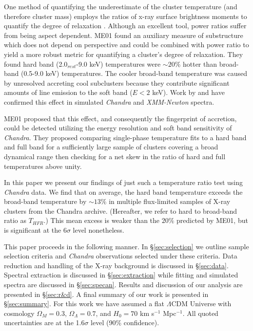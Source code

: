 \documentclass{emulateapj}
\newcommand{\tf}{T_{HFR} }
\begin{document}
One method of quantifying the underestimate of the cluster temperature 
(and therefore cluster mass) employs the ratios of x-ray surface brightness moments  
to quantify the degree of
relaxation \citep{1995ApJ...452..522B, 1996ApJ...458...27B,
2005ApJ...624..606J}. Although an excellent tool, power ratios
suffer from being aspect dependent. ME01 found an auxiliary measure
of substructure which does not depend on perspective and could be
combined with power ratio to yield a more robust metric for
quantifying a cluster's degree of relaxation. They found hard band
(2.0$_{rest}$-9.0 keV) temperatures were $\sim 20\%$ hotter than broad-band
(0.5-9.0 keV) temperatures. The cooler broad-band temperature was caused by
unresolved accreting cool subclusters because they
contribute significant amounts of line emission to the soft
band ($E<2$ keV). Work by \cite{2004MNRAS.354...10M} and
\cite{2006ApJ...640..710V} have confirmed this effect in simulated
{\textit{Chandra}} and {\textit{XMM-Newton}} spectra.

ME01 proposed that this effect, and consequently the fingerprint of
accretion, could be detected utilizing the energy resolution and
soft band sensitivity of {\textit{Chandra}}. They proposed comparing
single-phase temperature fits to a hard band and full band for a
sufficiently large sample of clusters covering a broad dynamical range
then checking for a net skew in the ratio of hard and full
temperatures above unity.

In this paper we present our findings of just such a temperature ratio test using
{\textit{Chandra}} data. We find that on average, the hard band temperature
exceeds the broad-band temperature by $\sim13\%$ in multiple flux-limited
samples of X-ray clusters from the Chandra archive.
(Hereafter, we refer to hard to broad-band ratio as $\tf$.) This mean excess is
weaker than the $20\%$ predicted by ME01, but is significant at the
$6\sigma$ level nonetheless.

This paper proceeds in the following manner. In \S\ref{sec:selection}
we outline sample selection criteria and {\textit{Chandra}}
observations selected under these criteria. Data reduction and handling of the
X-ray background is discussed in \S\ref{sec:data}. Spectral
extraction is discussed in \S\ref{sec:extraction} while fitting and
simulated spectra are discussed in \S\ref{sec:specan}. Results and
discussion of our analysis are presented in \S\ref{sec:r&d}. A final
summary of our work is presented in \S\ref{sec:summary}. For this work
we have assumed a flat $\Lambda$CDM Universe with cosmology $\Omega_{M} = 0.3$,
$\Omega_{\Lambda} = 0.7$, and $H_{0} = 70$ km s$^{-1}$ Mpc$^{-1}$. All
quoted uncertainties are at the 1.6$\sigma$ level (90\%
confidence). 
\end{document}
